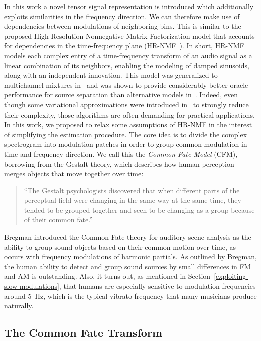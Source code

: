 In this work a novel tensor signal representation is introduced which additionally exploits similarities in the frequency direction.
We can therefore make use of dependencies between modulations of neighboring bins.
This is similar to the proposed High-Resolution Nonnegative Matrix Factorization model that accounts for dependencies in the time-frequency plane (HR-NMF~\cite{badeau11}).
In short, HR-NMF models each complex entry of a time-frequency transform of an audio signal as a linear combination of its neighbors, enabling the modeling of damped sinusoids, along with an independent innovation.
This model was generalized to multichannel mixtures in~\cite{badeau13a,badeau14} and was shown to provide considerably better oracle performance for source separation than alternative models in~\cite{magron15a}.
Indeed, even though some variational approximations were introduced in~\cite{badeau13} to strongly reduce their complexity, those algorithms are often demanding for practical applications.
In this work, we proposed to relax some assumptions of HR-NMF in the interest of simplifying the estimation procedure.
The core idea is to divide the complex spectrogram into modulation patches in order to group common modulation in time and frequency direction.
We call this the \emph{Common Fate Model} (CFM), borrowing from the Gestalt theory, which describes how human perception merges objects that move together over time:

\begin{quote}
``The Gestalt psychologists discovered that when different parts of the perceptual field were changing in the same way at the same time, they tended to be grouped together and seen to be changing as a group because of their common fate.''~\cite{bregman94}  
\end{quote}

Bregman introduced the Common Fate theory for auditory scene analysis as the ability to group sound objects based on their common motion over time, as occurs with frequency modulations of harmonic partials.
As outlined by Bregman, the human ability to detect and group sound sources by small differences in FM and AM is outstanding.
Also, it turns out, as mentioned in Section~\ref{exploiting-slow-modulations}, that humans are especially sensitive to modulation frequencies around 5~Hz, which is the typical vibrato frequency that many musicians produce naturally.

\subsection{The Common Fate Transform}
\label{sub:CFT}

